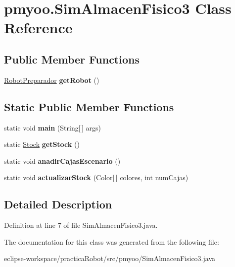 \hypertarget{classpmyoo_1_1_sim_almacen_fisico3}{}\section{pmyoo.\+Sim\+Almacen\+Fisico3 Class Reference}
\label{classpmyoo_1_1_sim_almacen_fisico3}
\subsection*{Public Member Functions}
\begin{DoxyCompactItemize}
\item 
\mbox{\label{classpmyoo_1_1_sim_almacen_fisico3_a781543f3f1b367cd29faf686062d63db}} 
\mbox{\hyperlink{classpmyoo_1_1_robot_preparador}{Robot\+Preparador}} {\bfseries get\+Robot} ()
\end{DoxyCompactItemize}
\subsection*{Static Public Member Functions}
\begin{DoxyCompactItemize}
\item 
\mbox{\label{classpmyoo_1_1_sim_almacen_fisico3_a3fa2c3aa560d8d865d83ec3a71f874cf}} 
static void {\bfseries main} (String\mbox{[}$\,$\mbox{]} args)
\item 
\mbox{\label{classpmyoo_1_1_sim_almacen_fisico3_aa1a130c4bffb0c57f476ff20bbe212fa}} 
static \mbox{\hyperlink{classpmyoo_1_1_stock}{Stock}} {\bfseries get\+Stock} ()
\item 
\mbox{\label{classpmyoo_1_1_sim_almacen_fisico3_aeeb77e9a0b31d0fc723a0a1181e4e93b}} 
static void {\bfseries anadir\+Cajas\+Escenario} ()
\item 
\mbox{\label{classpmyoo_1_1_sim_almacen_fisico3_aa403d72c1f4a0de83d353a166e0f32b8}} 
static void {\bfseries actualizar\+Stock} (Color\mbox{[}$\,$\mbox{]} colores, int num\+Cajas)
\end{DoxyCompactItemize}


\subsection{Detailed Description}


Definition at line 7 of file Sim\+Almacen\+Fisico3.\+java.



The documentation for this class was generated from the following file\+:\begin{DoxyCompactItemize}
\item 
eclipse-\/workspace/practica\+Robot/src/pmyoo/Sim\+Almacen\+Fisico3.\+java\end{DoxyCompactItemize}
